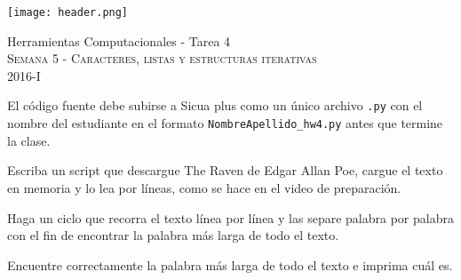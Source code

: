 \documentclass[11pt,letterpaper]{exam}
\begin{document}
\begin{center}

\texttt{[image: header.png]}

\vspace{1.0cm}
{\Large Herramientas Computacionales - Tarea 4} \\
\textsc{Semana 5 - Caracteres, listas y estructuras iterativas}\\
2016-I\\
\end{center}



\vspace{0.5cm}

\noindent
El c\'odigo fuente debe subirse a Sicua plus como un \'unico archivo
\verb".py" con el nombre del estudiante en el formato \verb"NombreApellido_hw4.py" antes que termine la clase.

\vspace{0.5cm}

\begin{questions}
 

Escriba un script que descargue The Raven de Edgar Allan Poe, cargue el texto en memoria y lo lea por l\'ineas, como se hace en el video de preparaci\'on.


Haga un ciclo que recorra el texto l\'inea por l\'inea y las separe palabra por palabra con el fin de encontrar la palabra m\'as larga de todo el texto. 


Encuentre correctamente la palabra m\'as larga de todo el texto e imprima cu\'al es.


\end{questions}
\end{document}
